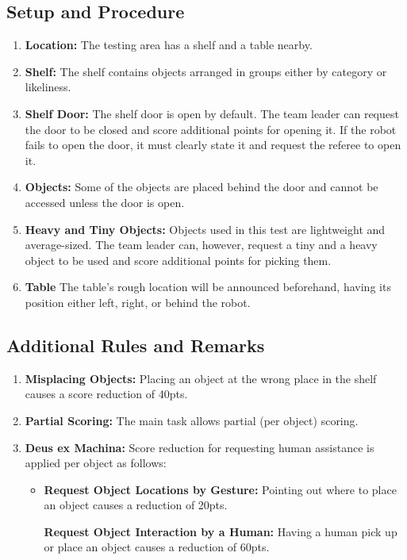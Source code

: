 \subsection*{Setup and Procedure}
\begin{enumerate}
	\item \textbf{Location:} The testing area has a shelf and a table nearby.

	\item \textbf{Shelf:} The shelf contains objects arranged in groups either by category or likeliness.

	\item \textbf{Shelf Door:} The shelf door is open by default.
	The team leader can request the door to be closed and score additional points for opening it. If the robot fails to open the door, it must clearly state it and request the referee to open it.

	\item \textbf{Objects:} Some of the objects are placed behind the door and cannot be accessed unless the door is open.
	
	\item \textbf{Heavy and Tiny Objects:} Objects used in this test are lightweight and average-sized.
	The team leader can, however, request a tiny and a heavy object to be used and score additional points for picking them.

	\item \textbf{Table} The table's rough location will be announced beforehand, having its position either left, right, or behind the robot.
\end{enumerate}


%
%
\subsection*{Additional Rules and Remarks}
\begin{enumerate}
	\item \textbf{Misplacing Objects:} Placing an object at the wrong place in the shelf causes a score reduction of 40pts.
	\item \textbf{Partial Scoring:} The main task allows partial (per object) scoring.
	\item \textbf{Deus ex Machina:} Score reduction for requesting human assistance is applied per object as follows:
	\begin{itemize}[nosep]
		\item \textbf{Request Object Locations by Gesture:} Pointing out where to place an object causes a reduction of 20pts.
		
		\textbf{Request Object Interaction by a Human:} Having a human pick up or place an object causes a reduction of 60pts.
	\end{itemize}
\end{enumerate}

